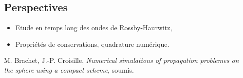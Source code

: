 \documentclass{sciposter}
\begin{document}
\begin{multicols}{3}
\section*{Perspectives}
\begin{itemize}
\item Etude en temps long des ondes de Rossby-Haurwitz,
\item Propriétés de conservations, quadrature numérique.
\end{itemize}




\begin{thebibliography}{99}
 {\sc M. Brachet, J.-P. Croisille}, \textit{Numerical simulations of propagation problemes on the sphere
using a compact scheme}, soumis.
\end{thebibliography}
\end{multicols}
\end{document}
